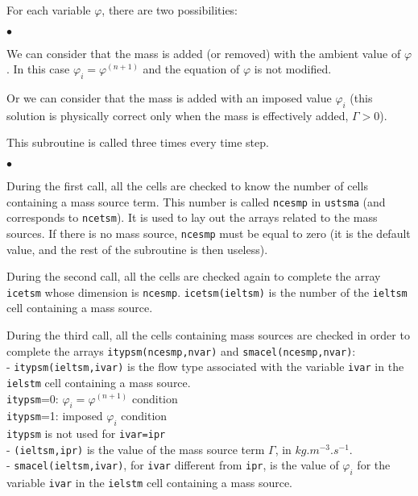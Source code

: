 {{{For each variable $\varphi$, there are two possibilities:
\begin{list}{$\bullet$}{}
\item We can consider that the mass is added (or removed) with the
      ambient value of $\varphi$. In this case
      $\varphi_i=\varphi^{(n+1)}$ and the equation of $\varphi$ is not
      modified.
\item Or we can consider that the mass is added with an
      imposed value $\varphi_i$ (this solution is physically correct
      only when the mass is effectively added, $\Gamma>0$).
\end{list}

\bigskip

This subroutine is called three times every time step.

\begin{list}{$\bullet$}{}
\item During the first call, all the cells are checked to know the
      number of cells containing a mass source term.
      This number is called \texttt{ncesmp} in
      \texttt{ustsma} (and corresponds to
      \texttt{ncetsm}). It is used to lay out the arrays
      related to the mass sources. If there is no mass source,
      \texttt{ncesmp} must be equal to zero (it is the default value, and the
      rest of the subroutine is then useless).

\item During the second call, all the cells are checked again to
      complete the array \texttt{icetsm} whose dimension is
      \texttt{ncesmp}. \mbox{\texttt{icetsm(ieltsm)}} is the number of the
      \texttt{ieltsm}\raisebox{1ex}{\small th} cell containing a mass source.

\item During the third call, all the cells containing mass sources are
      checked in order to complete the arrays
      \mbox{\texttt{itypsm(ncesmp,nvar)}} and
      \mbox{\texttt{smacel(ncesmp,nvar)}}:\\
- \texttt{itypsm(ieltsm,ivar)} is the flow type associated with the variable
      \texttt{ivar} in the \texttt{ielstm}\raisebox{1ex}{\small th} cell
      containing a mass source.\\
\hspace*{1cm}\texttt{itypsm}=0: $\varphi_i=\varphi^{(n+1)}$ condition\\
\hspace*{1cm}\texttt{itypsm}=1: imposed $\varphi_i$ condition\\
\hspace*{1cm}\texttt{itypsm} is not used for \texttt{ivar=ipr}\\
- \texttt{(ieltsm,ipr)} is the value of the mass source term $\Gamma$, in
$kg.m^{-3}.s^{-1}$.\\
- \texttt{smacel(ieltsm,ivar)}, for \texttt{ivar} different from
\texttt{ipr}, is the value
of $\varphi_i$ for the variable \texttt{ivar} in the
\texttt{ielstm}\raisebox{1ex}{\small th} cell containing a mass source.\\


\end{list}}}}
